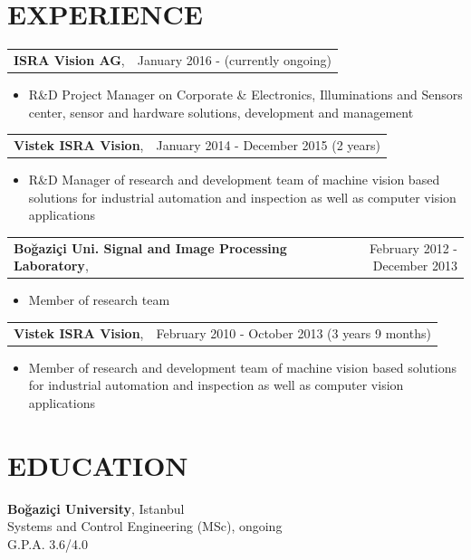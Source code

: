 \documentclass[margin]{res}
\begin{document}
\begin{resume}
		
		\vspace{.5in}
		\section{EXPERIENCE}
		\begin{tabular}{p{2in} r}
			{\bf ISRA Vision AG}, &  January 2016 - (currently ongoing)
		\end{tabular}	
		\begin{itemize}
			\item[] R\&D Project Manager on Corporate \& Electronics, Illuminations and Sensors center, sensor and hardware solutions, development and management 
		\end{itemize} 
		
		\begin{tabular}{p{2in} r}
			{\bf Vistek ISRA Vision}, &  January 2014 - December 2015 (2 years)
		\end{tabular}	
		\begin{itemize}
			\item[] R\&D Manager of research and development team of machine vision based solutions for industrial automation and inspection as well as computer vision applications
		\end{itemize} 
		
		\begin{tabular}{p{2in} r}
			{\bf Bo\u{g}azi\c{c}i Uni. Signal and Image Processing Laboratory},&  February 2012 -  December 2013 \\
		\end{tabular}	
		\begin{itemize}
			\vspace{.1cm}
			\item[] Member of research team
		\end{itemize}
		
		\begin{tabular}{p{2in} r}
			{\bf Vistek ISRA Vision}, &  February 2010 - October 2013 (3 years 9 months)
		\end{tabular}	
		\begin{itemize}
			\item[] Member of research and development team of machine vision based solutions for industrial automation and inspection as well as computer vision applications
		\end{itemize}
		
		\vspace{.5in}
		\section{EDUCATION}
		{\bf Bo\u{g}azi\c{c}i University}, Istanbul \\
		Systems and Control Engineering (MSc), ongoing \\
		G.P.A. 3.6/4.0
		

\end{resume}
\end{document}
